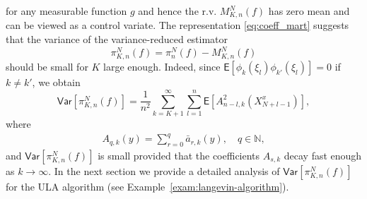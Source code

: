 \documentclass[bj]{imsart}
\def\PE{\mathsf{E}}
\def\PVar{\mathsf{Var}}
\begin{document}
for any measurable function $g$  and hence the r.v.  \(M_{K,n}^N(f)\) has zero mean and can be viewed as a control variate.
The representation \eqref{eq:coeff_mart} suggests that the variance of  the  variance-reduced estimator
\begin{equation}
\label{eq:29032018a3}
\pi_{K,n}^N(f)=\pi_n^N(f)-M_{K,n}^N(f)
\end{equation}
should be small for \(K\) large enough. Indeed, since $\PE[ \phi_k(\xi_l) \phi_{k'}(\xi_l)]=0$ if $k \ne k'$, we obtain
\begin{equation}
\label{eq:expression-variance}
\PVar[\pi_{K,n}^N(f)]=\frac{1}{n^2}\sum_{k=K+1}^{\infty}\sum_{l=1}^{n}\PE[A^2_{n-l,k}(X^x_{N+l-1})],
\end{equation}
where 
\begin{eqnarray}
\label{eq:definition-A-s,k}
A_{q,k}(y)=\sum_{r=0}^q \bar{a}_{r,k}(y),\quad q\in \mathbb{N},
\end{eqnarray}
and $\mathsf{Var}[\pi_{K,n}^N(f)]$ is small provided that the coefficients $A_{s,k}$ decay fast enough as $k\to \infty.$
In the next section   we provide a detailed   analysis of  $\mathsf{Var}[\pi_{K,n}^N(f)]$  for the  ULA  algorithm (see Example~\ref{exam:langevin-algorithm}).
\end{document}
